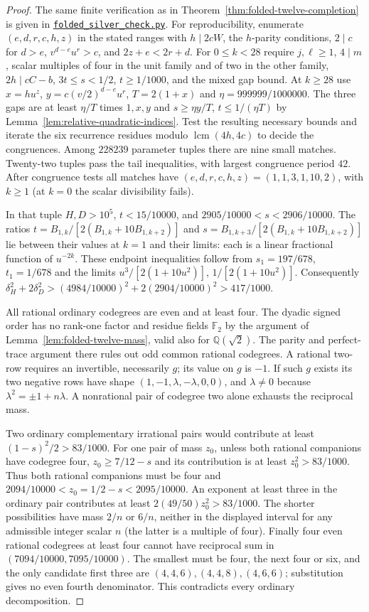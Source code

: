 \documentclass[11pt,reqno]{amsart}
\newcommand{\codefile}[1]{\href{https://github.com/sebastienpalcoux/grothendieck-ring-classification/blob/d5750105bb5758f3ad38d2e5464dfcc12c019816/supplements/rank6/sphericality/#1}{\nolinkurl{#1}}}
\theoremstyle{remark}\newtheorem{remark}[theorem]{Remark}
\numberwithin{equation}{section}
\begin{document}
\begin{proof}
The same finite verification as in Theorem~\ref{thm:folded-twelve-completion} is given in \codefile{folded_silver_check.py}. For reproducibility, enumerate $(e,d,r,c,h,z)$ in the stated ranges with $h\mid2cW$, the $h$-parity conditions, $2\mid c$ for $d>e$, $v^{d-e}u^r>c$, and $2z+e<2r+d$. For $0\le k<28$ require $j,\ell\ge1$, $4\mid m$, scalar multiples of four in the unit family and of two in the other family, $2h\mid cC-b$, $3t\le s<1/2$, $t\ge1/1000$, and the mixed gap bound. At $k\ge28$ use $x=hu^z$, $y=c(v/2)^{d-e}u^r$, $T=2(1+x)$ and $\eta=999999/1000000$. The three gaps are at least $\eta/T$ times $1,x,y$ and $s\ge\eta y/T$, $t\le1/(\eta T)$ by Lemma~\ref{lem:relative-quadratic-indices}. Test the resulting necessary bounds and iterate the six recurrence residues modulo $\operatorname{lcm}(4h,4c)$ to decide the congruences. Among $228239$ parameter tuples there are nine small matches. Twenty-two tuples pass the tail inequalities, with largest congruence period $42$. After congruence tests all matches have $(e,d,r,c,h,z)=(1,1,3,1,10,2)$, with $k\ge1$ (at $k=0$ the scalar divisibility fails).

In that tuple $H,D>10^5$, $t<15/10000$, and $2905/10000<s<2906/10000$. The ratios $t=B_{1,k}/[2(B_{1,k}+10B_{1,k+2})]$ and $s=B_{1,k+3}/[2(B_{1,k}+10B_{1,k+2})]$ lie between their values at $k=1$ and their limits: each is a linear fractional function of $u^{-2k}$. These endpoint inequalities follow from $s_1=197/678$, $t_1=1/678$ and the limits $u^3/[2(1+10u^2)]$, $1/[2(1+10u^2)]$. Consequently $\delta_H^2+2\delta_D^2>(4984/10000)^2+2(2904/10000)^2>417/1000$.

All rational ordinary codegrees are even and at least four. The dyadic signed order has no rank-one factor and residue fields $\mathbb F_2$ by the argument of Lemma~\ref{lem:folded-twelve-mass}, valid also for $\mathbb Q(\sqrt2)$. The parity and perfect-trace argument there rules out odd common rational codegrees. A rational two-row requires an invertible, necessarily $g$; its value on $g$ is $-1$. If such $g$ exists its two negative rows have shape $(1,-1,\lambda,-\lambda,0,0)$, and $\lambda\ne0$ because $\lambda^2=\pm1+n\lambda$. A nonrational pair of codegree two alone exhausts the reciprocal mass.

Two ordinary complementary irrational pairs would contribute at least $(1-s)^2/2>83/1000$. For one pair of mass $z_0$, unless both rational companions have codegree four, $z_0\ge7/12-s$ and its contribution is at least $z_0^2>83/1000$. Thus both rational companions must be four and $2094/10000<z_0=1/2-s<2095/10000$. An exponent at least three in the ordinary pair contributes at least $2(49/50)z_0^2>83/1000$. The shorter possibilities have mass $2/n$ or $6/n$, neither in the displayed interval for any admissible integer scalar $n$ (the latter is a multiple of four). Finally four even rational codegrees at least four cannot have reciprocal sum in $(7094/10000,7095/10000)$. The smallest must be four, the next four or six, and the only candidate first three are $(4,4,6),(4,4,8),(4,6,6)$; substitution gives no even fourth denominator. This contradicts every ordinary decomposition.
\end{proof}
\end{document}
